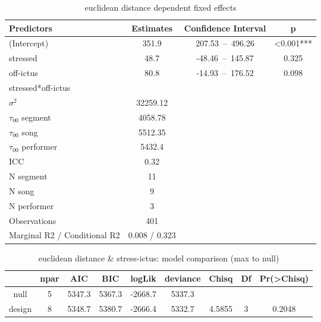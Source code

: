 
\begin{table}[htb]
\caption{euclidean distance dependent fixed effects}
\begin{center}
\begin{tabular}{|l|c|c|c|}
\hline							
Predictors	&	Estimates	&	Confidence Interval	&	p	\\
\hline
\hline
(Intercept)	&	351.9	&	207.53 – 496.26	&	<0.001***	\\
stressed 	&	48.7	&	-48.46 – 145.87	&	0.325	\\
off-ictus	&	80.8	&	-14.93 – 176.52	&	0.098	\\
stressed*off-ictus	&		&		&		\\
\hline							
\hline
$\sigma^2$	&	32259.12			&&		\\
$\tau_{00}$ segment	&	4058.78		&&			\\
$\tau_{00}$  song	&	5512.35				&&	\\
$\tau_{00}$  performer	&	5432.4				&&	\\
ICC	&	0.32		&&			\\
\hline
\hline
N segment	&	11		&&			\\
N song	&	9				&&	\\
N performer	&	3		&&			\\
Observations	&	401				&&	\\
Marginal R2 / Conditional R2	&	0.008 / 0.323		&&			\\									
\hline							
\end{tabular}
\end{center}
\label{randolmereuc}
\end{table}%


\begin{table}[htb]
\caption{euclidean distance \& stress-ictus: model comparison (max to null) }
\begin{center}
\centering
\begin{tabular}{|ccccccccc|}

\hline
     &       npar  &  AIC   & BIC  & logLik & deviance  & Chisq & Df & Pr(>Chisq) \\
     \hline
     \hline
null  &  5 & 5347.3 & 5367.3 & -2668.7  & 5337.3             \\        
design    &      8 & 5348.7& 5380.7 &-2666.4  & 5332.7 & 4.5855 & 3   &  0.2048 \\
\hline
\end{tabular}
\end{center}
\label{aoveuc}
\end{table}%


%
%
%

